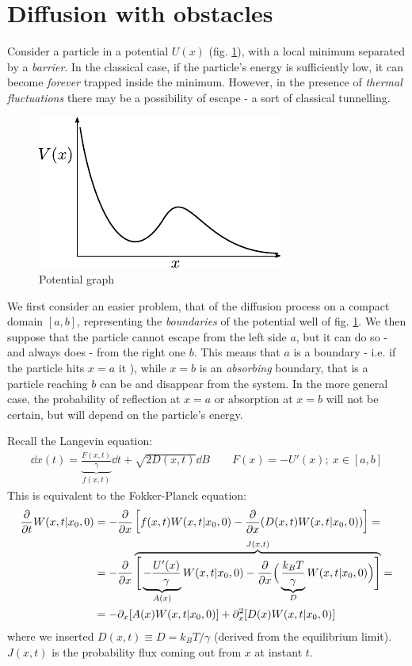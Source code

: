 \documentclass[../template.tex]{subfiles}
\begin{document}
\section{Diffusion with obstacles} 
Consider a particle in a potential $U(x)$ (fig. \ref{fig:potential}), with a local minimum separated by a \textit{barrier}. In the classical case, if the particle's energy is sufficiently low, it can become \textit{forever} trapped inside the minimum. However, in the presence of \textit{thermal fluctuations} there may be a possibility of escape - a sort of classical tunnelling. 

\begin{figure}[H]
    \centering
    \includegraphics{Images/potential.pdf}
    \caption{Potential graph\label{fig:potential}}
\end{figure}
We first consider an easier problem, that of the diffusion process on a compact domain $[a,b]$, representing the \textit{boundaries} of the potential well of fig. \ref{fig:potential}. We then suppose that the particle cannot escape from the left side $a$, but it can do so - and always does - from the right one $b$. This means that $a$ is a  boundary - i.e. if the particle hits $x=a$ it ), while $x=b$ is an \textit{absorbing} boundary, that is a particle reaching $b$ can be  and disappear from the system. In the more general case, the probability of reflection at $x=a$ or absorption at $x=b$ will not be certain, but will depend on the particle's energy.

\medskip

Recall the Langevin equation:
\begin{align*}
    \dd{x(t)} = \underbrace{\frac{F(x,t)}{\gamma}}_{f(x,t)}\dd{t}  + \sqrt{2D(x,t)} \dd{B} \qquad F(x) = - U'(x);\> x \in [a,b]
\end{align*}
This is equivalent to the Fokker-Planck equation:
\begin{align}\nonumber
    \pdv{t} W(x,t|x_0,0) &= -\pdv{x}\left[f(x,t) W(x,t|x_0,0) - \pdv{x} (D(x,t) W(x,t|x_0,0))\right] =\\
    &= -\pdv{x}\overbrace{\Bigg[\underbrace{-\frac{U'(x)}{\gamma}}_{A(x)}W(x,t|x_0,0) -  \pdv{x}\Big(\underbrace{\frac{k_B T}{\gamma}}_{D}   W(x,t|x_0,0)\Big)\Bigg]}^{J(x,t)} \label{eqn:fp-boundaries} =\\ \label{eqn:fp-simple}
    &= -\partial_x [A(x) W(x,t|x_0,0)] + \partial_x^2 [D(x) W(x,t|x_0,0)]
\end{align}
where we inserted $D(x,t) \equiv D =k_B T/\gamma$ (derived from the equilibrium limit). $J(x,t)$ is the probability flux coming out from $x$ at instant $t$.
\end{document}

